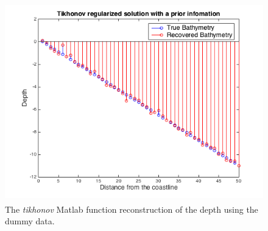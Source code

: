 \begin{figure}[H]
\center
\includegraphics[scale=0.6]{img/Tikhnove_reg.png} 
\caption{The \textit{tikhonov }Matlab\textsuperscript{\textregistered} function reconstruction of the depth using the dummy data.}
\label{TR-recon}
\end{figure}










%
%
%
%
%

